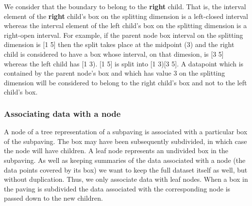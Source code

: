 \-We consider that the boundary to belong to the {\bfseries right} child. \-That is, the interval element of the {\bfseries right} child's box on the splitting dimension is a left-\/closed interval whereas the interval element of the left child's box on the splitting dimension is a right-\/open interval. \-For example, if the parent node box interval on the splitting dimension is \mbox{[}1 5\mbox{]} then the split takes place at the midpoint (3) and the right child is considered to have a box whose interval, on that dimesion, is \mbox{[}3 5\mbox{]} whereas the left child has \mbox{[}1 3). \mbox{[}1 5\mbox{]} is split into \mbox{[}1 3)\mbox{[}3 5\mbox{]}. \-A datapoint which is contained by the parent node's box and which has value 3 on the splitting dimension will be considered to belong to the right child's box and not to the left child's box.\hypertarget{StatsSubPavings_statssubsec_data}{}\subsubsection{\-Associating data with a node}\label{StatsSubPavings_statssubsec_data}
\-A node of a tree representation of a subpaving is associated with a particular box of the subpaving. \-The box may have been subsequently subdivided, in which case the node will have children. \-A leaf node represents an undivided box in the subpaving. \-As well as keeping summaries of the data associated with a node (the data points covered by its box) we want to keep the full dataset itself as well, but without duplication. \-Thus, we only associate data with leaf nodes. \-When a box in the paving is subdivided the data associated with the corresponding node is passed down to the new children.

